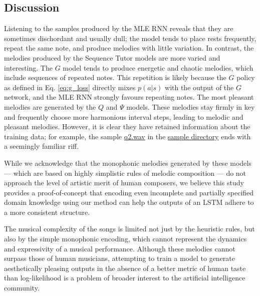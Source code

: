 \subsection{Discussion}
Listening to the samples produced by the MLE RNN reveals that they are sometimes dischordant and usually dull; the model tends to place rests frequently, repeat the same note, and produce melodies with little variation. In contrast, the melodies produced by the Sequence Tutor models are more varied and interesting. The $G$ model tends to produce energetic and chaotic melodies, which include sequences of repeated notes. This repetition is likely because the $G$ policy as defined in Eq. \ref{eq:g_loss} directly mixes $p(a|s)$ with the output of the $G$ network, and the MLE RNN strongly favours repeating notes. The most pleasant melodies are generated by the $Q$ and $\Psi$ models. These melodies stay firmly in key and frequently choose more harmonious interval steps, leading to melodic and pleasant melodies. However, it is clear they have retained information about the training data; for example, the sample \href{https://www.youtube.com/watch?v=rJ0KQjku7T4&feature=youtu.be}{q2.wav} in the \href{goo.gl/XIYt9m}{sample directory} ends with a seemingly familiar riff. 

While we acknowledge that the monophonic melodies generated by these models --- which are based on highly simplistic rules of melodic composition --- do not approach the level of artistic merit of human composers, we believe this study provides a proof-of-concept that encoding even incomplete and partially specified domain knowledge using our method can help the outputs of an LSTM adhere to a more consistent structure.

The musical complexity of the songs is limited not just by the heuristic rules, but also by the simple monophonic encoding, which cannot represent the dynamics and expressivity of a musical performance. Although these melodies cannot surpass those of human musicians, attempting to train a model to generate aesthetically pleasing outputs in the absence of a better metric of human taste than log-likelihood is a problem of broader interest to the artificial intelligence community. 

